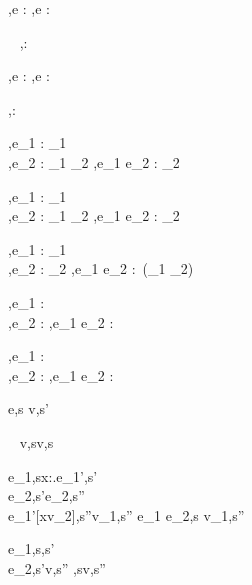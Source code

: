   {\Gamma,\Sigma \infers e : \beta}
  {\Gamma,\Sigma \infers \Edit e : \Task \beta}

  {\ }
  {\Gamma,\Sigma \infers \Enter \beta : \Task \beta}

  {\Gamma,\Sigma \infers e : \Reference \beta}
  {\Gamma,\Sigma \infers \Update e : \Task \beta}


  { }
  {\Gamma,\Sigma \infers \Fail : \Task \alpha}


  {\Gamma,\Sigma \infers e_1 : \Task \tau_1 \\
   \Gamma,\Sigma \infers e_2 : \tau_1 \to \Task \tau_2}
  {\Gamma,\Sigma \infers e_1 \Then e_2 : \Task \tau_2}


  {\Gamma,\Sigma \infers e_1 : \Task \tau_1 \\
   \Gamma,\Sigma \infers e_2 : \tau_1 \to \Task \tau_2}
  {\Gamma,\Sigma \infers e_1 \Next e_2 : \Task \tau_2}


  {\Gamma,\Sigma \infers e_1 : \Task \tau_1 \\
   \Gamma,\Sigma \infers e_2 : \Task \tau_2}
  {\Gamma,\Sigma \infers e_1 \And e_2 : \Task\,(\tau_1 \times \tau_2)}


  {\Gamma,\Sigma \infers e_1 : \Task \tau \\
   \Gamma,\Sigma \infers e_2 : \Task \tau }
  {\Gamma,\Sigma \infers e_1 \Or e_2 : \Task \tau}


  {\Gamma,\Sigma \infers e_1 : \Task \tau \\
   \Gamma,\Sigma \infers e_2 : \Task \tau }
  {\Gamma,\Sigma \infers e_1 \Xor e_2 : \Task \tau}





  {e,s \evaluate v,s'}

  {\ }
  {v,s\evaluate v,s}

  {e_1,s\evaluate \lambda x:\tau.e_1',s'\\
   e_2,s'\evaluate e_2,s''\\
   e_1'[x\mapsto v_2],s''\evaluate v_1,s''}
  {e_1 e_2,s \evaluate v_1,s''}

    {e_1,s\evaluate \True,s'\\
     e_2,s'\evaluate v,s''}
    {,s\evaluate v,s''}

